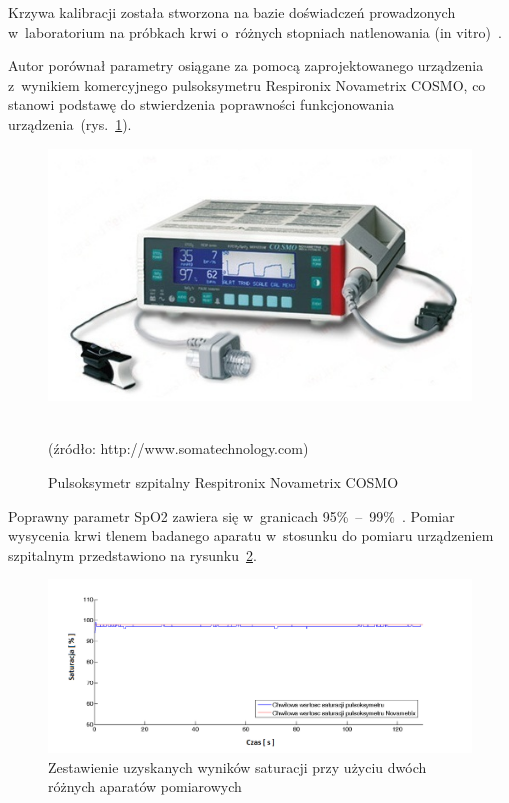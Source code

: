 \noindent Krzywa kalibracji została stworzona na bazie doświadczeń prowadzonych w~laboratorium na próbkach krwi o~różnych stopniach 
natlenowania (in vitro)~\cite{Katja:2011}.

Autor porównał parametry osiągane za pomocą zaprojektowanego urządzenia z~wynikiem komercyjnego pulsoksymetru Respironix Novametrix COSMO, co 
stanowi podstawę do stwierdzenia poprawności funkcjonowania urządzenia~(rys.~\ref{rys:COSMO}).
\begin{figure}[!ht]
	\centerline{\includegraphics[scale = 0.80]{graphic/COSMO}}
	\caption{Pulsoksymetr szpitalny Respitronix Novametrix COSMO}
	\label{rys:COSMO}
	~\\
	(źródło: http://www.somatechnology.com)
\end{figure}
Poprawny parametr SpO2 zawiera się w~granicach 95\%~–~99\%~\cite{SzGa11}. Pomiar wysycenia krwi tlenem badanego aparatu w~stosunku 
do pomiaru urządzeniem szpitalnym przedstawiono na rysunku~\ref{rys:Saturacja1}.
\begin{figure}[!ht]
	\centerline{\includegraphics[scale = 0.60]{graphic/Saturacja1}}
	\caption{Zestawienie uzyskanych wyników saturacji przy użyciu dwóch różnych aparatów pomiarowych}
	\label{rys:Saturacja1}
\end{figure}


